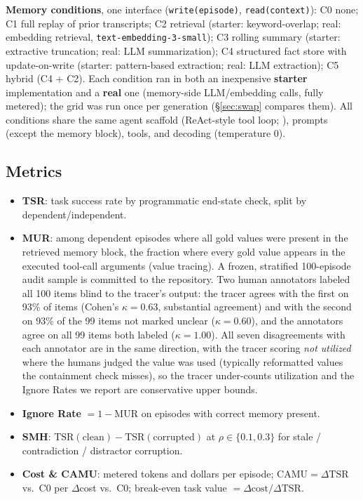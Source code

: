 \documentclass[11pt]{article}
\begin{document}
\textbf{Memory conditions}, one interface (\texttt{write(episode)},
\texttt{read(context)}): C0 none; C1 full replay of prior transcripts; C2
retrieval (starter: keyword-overlap; real: embedding retrieval,
\texttt{text-embedding-3-small}); C3 rolling summary (starter: extractive
truncation; real: LLM summarization); C4 structured fact store with
update-on-write (starter: pattern-based extraction; real: LLM extraction);
C5 hybrid (C4 + C2). Each condition ran in both an inexpensive
\textbf{starter} implementation and a \textbf{real} one (memory-side
LLM/embedding calls, fully metered); the grid was run once per generation
(\S\ref{sec:swap} compares them). All conditions share the same agent
scaffold (ReAct-style tool loop; \citealp{react}), prompts (except the
memory block), tools, and decoding (temperature 0).

\subsection{Metrics}\label{sec:metrics}

\begin{itemize}
\item \textbf{TSR}: task success rate by programmatic end-state check, split
by dependent/independent.
\item \textbf{MUR}: among dependent episodes where all gold values were
present in the retrieved memory block, the fraction where every gold value
appears in the executed tool-call arguments (value tracing). A frozen,
stratified 100-episode audit sample is committed to the repository. Two human annotators labeled all 100 items blind to the tracer's output:
the tracer agrees with the first on 93\% of items (Cohen's $\kappa = 0.63$,
substantial agreement) and with the second on 93\% of the 99 items not
marked unclear ($\kappa = 0.60$), and the annotators agree on all 99 items
both labeled ($\kappa = 1.00$). All seven disagreements with each annotator
are in the same direction, with the tracer scoring \emph{not utilized}
where the humans judged the value was used (typically reformatted values the containment
check misses), so the tracer under-counts utilization and the Ignore
Rates we report are conservative upper bounds.
\item \textbf{Ignore Rate} $= 1 - \mathrm{MUR}$ on episodes with correct
memory present.
\item \textbf{SMH}: $\mathrm{TSR}(\text{clean}) -
\mathrm{TSR}(\text{corrupted})$ at $\rho \in \{0.1, 0.3\}$ for stale /
contradiction / distractor corruption.
\item \textbf{Cost \& CAMU}: metered tokens and dollars per episode;
$\mathrm{CAMU} = \Delta\mathrm{TSR}$ vs.\ C0 per $\Delta$cost vs.\ C0;
break-even task value $= \Delta\text{cost}/\Delta\mathrm{TSR}$.
\end{itemize}
\end{document}
